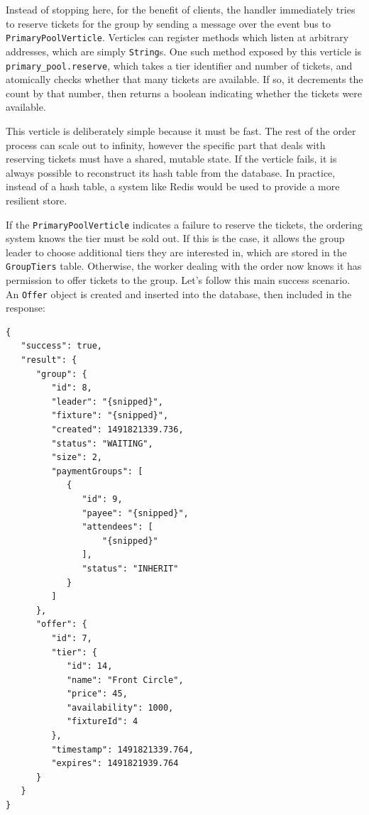 \documentclass[12pt,a4paper]{bhamdissertation}
\newcommand{\code}[1]{\texttt{#1}}
\begin{document}
Instead of stopping here, for the benefit of clients, the handler immediately tries to reserve tickets for the group by sending a message over the event bus to \code{Primary\-Pool\-Verticle}. Verticles can register methods which listen at arbitrary addresses, which are simply \code{String}s. One such method exposed by this verticle is \code{primary\_pool.\-reserve}, which takes a tier identifier and number of tickets, and atomically checks whether that many tickets are available. If so, it decrements the count by that number, then returns a boolean indicating whether the tickets were available.

This verticle is deliberately simple because it must be fast. The rest of the order process can scale out to infinity, however the specific part that deals with reserving tickets must have a shared, mutable state. If the verticle fails, it is always possible to reconstruct its hash table from the database. In practice, instead of a hash table, a system like Redis would be used to provide a more resilient store.

If the \code{Primary\-Pool\-Verticle} indicates a failure to reserve the tickets, the ordering system knows the tier must be sold out. If this is the case, it allows the group leader to choose additional tiers they are interested in, which are stored in the \code{GroupTiers} table. Otherwise, the worker dealing with the order now knows it has permission to offer tickets to the group. Let's follow this main success scenario. An \code{Offer} object is created and inserted into the database, then included in the response:

\begin{verbatim}
{
   "success": true,
   "result": {
      "group": {
         "id": 8,
         "leader": "{snipped}",
         "fixture": "{snipped}",
         "created": 1491821339.736,
         "status": "WAITING",
         "size": 2,
         "paymentGroups": [
            {
               "id": 9,
               "payee": "{snipped}",
               "attendees": [
                   "{snipped}"
               ],
               "status": "INHERIT"
            }
         ]
      },
      "offer": {
         "id": 7,
         "tier": {
            "id": 14,
            "name": "Front Circle",
            "price": 45,
            "availability": 1000,
            "fixtureId": 4
         },
         "timestamp": 1491821339.764,
         "expires": 1491821939.764
      }
   }
}
\end{verbatim}
\end{document}
